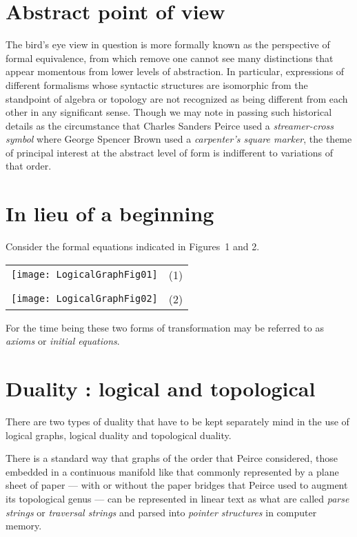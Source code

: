 \documentclass[12pt]{article}
\begin{document}
\tableofcontents

\section{Abstract point of view}

The bird's eye view in question is more formally known as the perspective of formal equivalence, from which remove one cannot see many distinctions that appear momentous from lower levels of abstraction.  In particular, expressions of different formalisms whose syntactic structures are isomorphic from the standpoint of algebra or topology are not recognized as being different from each other in any significant sense.  Though we may note in passing such historical details as the circumstance that Charles Sanders Peirce used a \textit{streamer-cross symbol} where George Spencer Brown used a \textit{carpenter's square marker}, the theme of principal interest at the abstract level of form is indifferent to variations of that order.

\section{In lieu of a beginning}

Consider the formal equations indicated in Figures~1 and 2.

\begin{center}\begin{tabular}{cc}
\texttt{[image: LogicalGraphFig01]} & (1) \\
\\
\texttt{[image: LogicalGraphFig02]} & (2) \\
\end{tabular}\end{center}

For the time being these two forms of transformation may be referred to as \textit{axioms} or \textit{initial equations}.

\section{Duality : logical and topological}

There are two types of duality that have to be kept separately mind in the use of logical graphs, logical duality and topological duality.

There is a standard way that graphs of the order that Peirce considered, those embedded in a continuous manifold like that commonly represented by a plane sheet of paper --- with or without the paper bridges that Peirce used to augment its topological genus --- can be represented in linear text as what are called \textit{parse strings} or \textit{traversal strings} and parsed into \textit{pointer structures} in computer memory.
\end{document}
